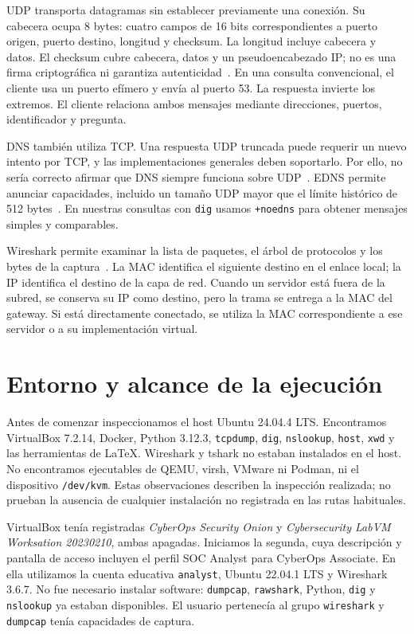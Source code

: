 \documentclass[11pt,a4paper]{article}
\begin{document}
UDP transporta datagramas sin establecer previamente una conexión. Su
cabecera ocupa 8 bytes: cuatro campos de 16 bits correspondientes a puerto
origen, puerto destino, longitud y checksum. La longitud incluye cabecera y
datos. El checksum cubre cabecera, datos y un pseudoencabezado IP; no es una
firma criptográfica ni garantiza autenticidad~\cite{rfc768}. En una consulta
convencional, el cliente usa un puerto efímero y envía al puerto 53. La
respuesta invierte los extremos. El cliente relaciona ambos mensajes mediante
direcciones, puertos, identificador y pregunta.

DNS también utiliza TCP. Una respuesta UDP truncada puede requerir un nuevo
intento por TCP, y las implementaciones generales deben soportarlo. Por ello,
no sería correcto afirmar que DNS siempre funciona sobre UDP~\cite{rfc7766}.
EDNS permite anunciar capacidades, incluido un tamaño UDP mayor que el límite
histórico de 512 bytes~\cite{rfc6891}. En nuestras consultas con \texttt{dig}
usamos \texttt{+noedns} para obtener mensajes simples y comparables.

Wireshark permite examinar la lista de paquetes, el árbol de protocolos y los
bytes de la captura~\cite{wireshark}. La MAC identifica el siguiente destino
en el enlace local; la IP identifica el destino de la capa de red. Cuando
un servidor está fuera de la subred, se conserva su IP como destino, pero la
trama se entrega a la MAC del gateway. Si está directamente conectado, se
utiliza la MAC correspondiente a ese servidor o a su implementación virtual.

\section{Entorno y alcance de la ejecución}
\label{sec:entorno}

Antes de comenzar inspeccionamos el host Ubuntu 24.04.4 LTS. Encontramos
VirtualBox 7.2.14, Docker, Python 3.12.3, \texttt{tcpdump}, \texttt{dig},
\texttt{nslookup}, \texttt{host}, \texttt{xwd} y las herramientas de LaTeX.
Wireshark y tshark no estaban instalados en el host. No encontramos ejecutables
de QEMU, virsh, VMware ni Podman, ni el dispositivo \nolinkurl{/dev/kvm}.
Estas observaciones describen la inspección realizada; no prueban la ausencia
de cualquier instalación no registrada en las rutas habituales.

VirtualBox tenía registradas \emph{CyberOps Security Onion} y
\emph{Cybersecurity LabVM Worksation 20230210}, ambas apagadas. Iniciamos la
segunda, cuya descripción y pantalla de acceso incluyen el perfil SOC Analyst
para CyberOps Associate. En ella utilizamos la cuenta educativa
\texttt{analyst}, Ubuntu 22.04.1 LTS y Wireshark 3.6.7. No fue necesario
instalar software: \texttt{dumpcap}, \texttt{rawshark}, Python, \texttt{dig}
y \texttt{nslookup} ya estaban disponibles. El usuario pertenecía al grupo
\texttt{wireshark} y \texttt{dumpcap} tenía capacidades de captura.
\end{document}
